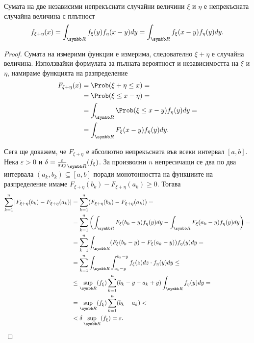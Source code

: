 \documentclass[numbers=endperiod, bibliography=totocnumbered]{scrartcl}
\begin{document}
\begin{proposition}\label{thm:density_of_sum_is_convolution}
  Сумата на две независими непрекъснати случайни величини \( \xi \) и \( \eta \) е непрекъсната случайна величина с плътност
  \begin{equation*}
    f_{\xi + \eta} (x)
    =
    \int_{\R} f_\xi(y) f_\eta(x - y) dy
    =
    \int_{\R} f_\xi(x - y) f_\eta(y) dy.
  \end{equation*}
\end{proposition}
\begin{proof} Сумата на измерими функции е измерима, следователно \( \xi + \eta \) е случайна величина. Използвайки формулата за пълната вероятност и независимостта на \( \xi \) и \( \eta \), намираме функцията на разпределение
  \begin{align*}
    F_{\xi + \eta} (x)
    &=
    \Prob(\xi + \eta \leq x)
    = \\ &=
    \Prob(\xi \leq x - \eta)
    = \\ &=
    \int_{\R} \Prob(\xi \leq x - y) f_\eta(y) dy
    = \\ &=
    \int_{\R} F_\xi(x - y) f_\eta(y) dy.
  \end{align*}

  Сега ще докажем, че \( F_{\xi + \eta} \) е абсолютно непрекъсната във всеки интервал \( [a, b] \). Нека \( \varepsilon > 0 \) и \( \delta = \frac \varepsilon \sup_{\R}(f_\xi) \). За произволни \( n \) непресичащи се два по два интервала \( (a_k, b_k) \subseteq [a, b] \) поради монотонността на функциите на разпределение имаме \( F_{\xi+\eta} (b_k) - F_{\xi+\eta}(a_k) \geq 0 \). Тогава
  \begin{align*}
    \sum_{k=1}^n \Abs{F_{\xi+\eta} (b_k) - F_{\xi+\eta}(a_k)}
    &=
    \sum_{k=1}^n (F_{\xi+\eta} (b_k) - F_{\xi+\eta}(a_k))
    = \\ &=
    \sum_{k=1}^n \left(\int_{\R} F_\xi(b_k - y) f_\eta(y) dy - \int_{\R} F_\xi(a_k - y) f_\eta(y) dy \right)
    = \\ &=
    \sum_{k=1}^n \int_{\R} (F_\xi(b_k - y) - F_\xi(a_k - y)) f_\eta(y) dy
    = \\ &=
    \sum_{k=1}^n \int_{\R} \int_{a_k - y}^{b_k - y} f_\xi(z) dz \cdot f_\eta(y) dy
    \leq \\ &\leq
    \sup_{\R}(f_\xi) \sum_{k=1}^n (b_k - y - a_k + y) \int_{\R} f_\eta(y) dy
    = \\ &=
    \sup_{\R}(f_\xi) \sum_{k=1}^n (b_k - a_k)
    < \\ &<
    \delta \sup_{\R}(f_\xi)
    =
    \varepsilon.
  \end{align*}


\end{proof}
\end{document}
